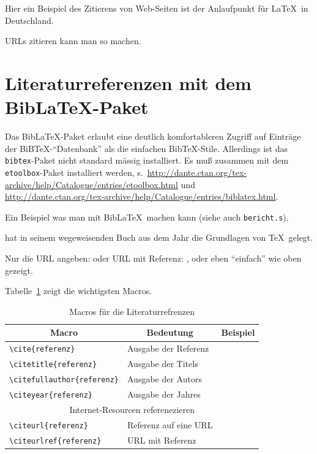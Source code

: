 Hier ein Beispiel des Zitierens von Web-Seiten
\cite{dante.2010a} ist der Anlaufpunkt für \LaTeX\ in Deutschland.

URLs zitieren kann man so \cite{dante.2010a} machen.

\section{Literaturreferenzen mit dem Bib\LaTeX-Paket}

Das Bib\LaTeX-Paket erlaubt eine deutlich komfortableren Zugriff auf Einträge der
BiB\TeX-"`Datenbank"' als die einfachen Bib\TeX-Stile. Allerdings ist das \texttt{bibtex}-Paket
nicht standard mässig installiert. Es muß zusammen mit dem \texttt{etoolbox}-Paket installiert
werden, s.\
\url{http://dante.ctan.org/tex-archive/help/Catalogue/entries/etoolbox.html} und\\
\url{http://dante.ctan.org/tex-archive/help/Catalogue/entries/biblatex.html}.


Ein Beispiel was man mit Bib\LaTeX\ machen kann (siehe auch \texttt{bericht.s}).

 hat in seinem wegeweisenden Buch
 aus dem Jahr \citeyear{knuth.1984a}
die Grundlagen von \TeX\ gelegt.

Nur die URL angeben:  oder URL mit Referenz:
\citeurlref{dante.2010a}, oder eben "`einfach"' wie oben gezeigt.

Tabelle~\ref{bibtex-macros} zeigt die wichtigsten Macros.
\begin{table}
\begin{center}
\small
\begin{tabular}{|l|l|l|}\hline
\multicolumn{1}{|c}{Macro}        & \multicolumn{1}{|c}{Bedeutung} &    \multicolumn{1}{|c|}{Beispiel} \\\hline\hline
\verb+\cite{referenz}+            & Ausgabe der Referenz           & \cite{knuth.1984a}             \\
\verb+\citetitle{referenz}+       & Ausgabe der Titels             & \citetitle{knuth.1984a}        \\
\verb+\citefullauthor{referenz}+  & Ausgabe der Autors             & \citefullauthor{knuth.1984a}   \\
\verb+\citeyear{referenz}+        & Ausgabe der Jahres             & \citeyear{knuth.1984a}         \\\hline
\multicolumn{3}{|c|}{Internet-Resourcen referenezieren}                                             \\\hline
\verb+\citeurl{referenz}+         & Referenz auf eine URL          & \citeurl{dante.2010a}          \\
\verb+\citeurlref{referenz}+      & URL  mit Referenz              & \citeurlref{dante.2010a}       \\\hline
\end{tabular}
\end{center}
\caption{\label{bibtex-macros}Macros für die Literaturrefrenzen}
\end{table}

